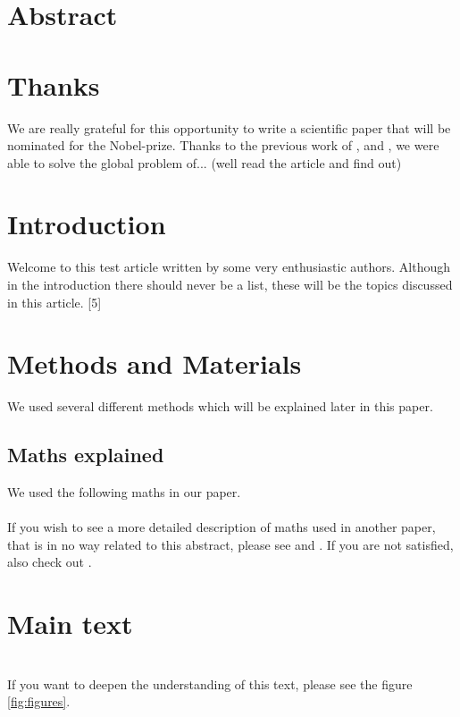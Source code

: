\documentclass[fleqn,10pt]{olplainarticle}
\begin{document}
\flushbottom


\section*{Abstract}
\blindtext[2]

\section*{Thanks}
We are really grateful for this opportunity to write a scientific paper that will be nominated for the Nobel-prize. Thanks to the previous work of \cite{Auctions}, \cite{Corona} and \cite{Tailwagseconomy}, we were able to solve the global problem of... (well read the article and find out)

\newpage
\section{Introduction}
Welcome to this test article written by some very enthusiastic authors. Although in the introduction there should never be a list, these will be the topics discussed in this article.
[5]

\section{Methods and Materials}

We used several different methods which will be explained later in this paper.

\subsection{Maths explained}
We used the following maths in our paper.\\
\blindmathtrue
\blindtext[2]\\
If you wish to see a more detailed description of maths used in another paper, that is in no way related to this abstract, please see \cite{Tailwagseconomy} and \cite{Corona}. If you are not satisfied, also check out \cite{Auctions}.

\section{Main text}
\blindtext[15]\\
If you want to deepen the understanding of this text, please see the figure \ref{fig:figures}. 
\end{document}
